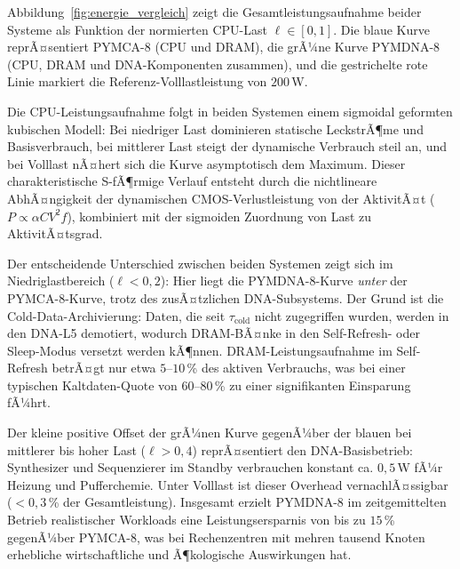 ﻿\documentclass[a4paper,12pt]{article}
\theoremstyle{definition}
\begin{document}
Abbildung~\ref{fig:energie_vergleich} zeigt die Gesamtleistungsaufnahme beider Systeme als Funktion der normierten CPU-Last $\ell \in [0, 1]$. Die blaue Kurve reprÃ¤sentiert PYMCA-8 (CPU und DRAM), die grÃ¼ne Kurve PYMDNA-8 (CPU, DRAM und DNA-Komponenten zusammen), und die gestrichelte rote Linie markiert die Referenz-Volllastleistung von $200$\,W.

Die CPU-Leistungsaufnahme folgt in beiden Systemen einem sigmoidal geformten kubischen Modell: Bei niedriger Last dominieren statische LeckstrÃ¶me und Basisverbrauch, bei mittlerer Last steigt der dynamische Verbrauch steil an, und bei Volllast nÃ¤hert sich die Kurve asymptotisch dem Maximum. Dieser charakteristische S-fÃ¶rmige Verlauf entsteht durch die nichtlineare AbhÃ¤ngigkeit der dynamischen CMOS-Verlustleistung von der AktivitÃ¤t ($P \propto \alpha C V^2 f$), kombiniert mit der sigmoiden Zuordnung von Last zu AktivitÃ¤tsgrad.

Der entscheidende Unterschied zwischen beiden Systemen zeigt sich im Niedriglastbereich ($\ell < 0{,}2$): Hier liegt die PYMDNA-8-Kurve \emph{unter} der PYMCA-8-Kurve, trotz des zusÃ¤tzlichen DNA-Subsystems. Der Grund ist die Cold-Data-Archivierung: Daten, die seit $\tau_{\mathrm{cold}}$ nicht zugegriffen wurden, werden in den DNA-L5 demotiert, wodurch DRAM-BÃ¤nke in den Self-Refresh- oder Sleep-Modus versetzt werden kÃ¶nnen. DRAM-Leistungsaufnahme im Self-Refresh betrÃ¤gt nur etwa $5$--$10$\,\% des aktiven Verbrauchs, was bei einer typischen Kaltdaten-Quote von $60$--$80$\,\% zu einer signifikanten Einsparung fÃ¼hrt.

Der kleine positive Offset der grÃ¼nen Kurve gegenÃ¼ber der blauen bei mittlerer bis hoher Last ($\ell > 0{,}4$) reprÃ¤sentiert den DNA-Basisbetrieb: Synthesizer und Sequenzierer im Standby verbrauchen konstant ca. $0{,}5$\,W fÃ¼r Heizung und Pufferchemie. Unter Volllast ist dieser Overhead vernachlÃ¤ssigbar ($< 0{,}3$\,\% der Gesamtleistung). Insgesamt erzielt PYMDNA-8 im zeitgemittelten Betrieb realistischer Workloads eine Leistungsersparnis von bis zu $15$\,\% gegenÃ¼ber PYMCA-8, was bei Rechenzentren mit mehren tausend Knoten erhebliche wirtschaftliche und Ã¶kologische Auswirkungen hat.
\end{document}
